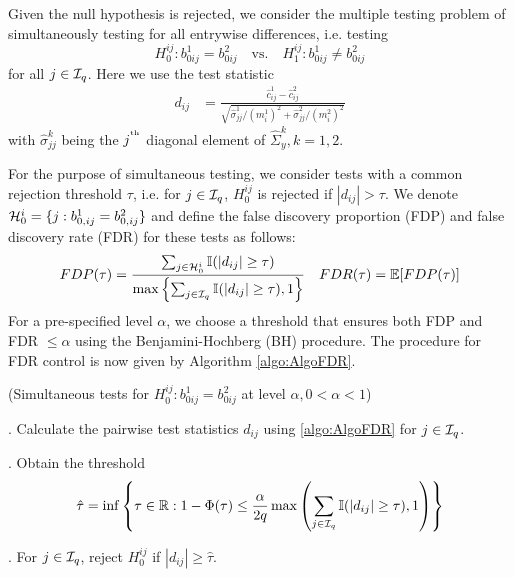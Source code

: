 Given the null hypothesis is rejected, we consider the multiple testing problem of simultaneously testing for all entrywise differences, i.e. testing
%
$$
H_0^{ij}: b_{0 ij}^1 = b_{0ij}^2 \quad \text{vs.} \quad H_1^{ij}: b_{0 ij}^1 \neq b_{0 ij}^2 
$$
%
for all $j \in {\cal{I}}_q$. Here we use the test statistic
%
\begin{align}\label{eqn:PairwiseStatistic}
d_{ij} &= \frac{\widehat c_{ij}^1 - \widehat c_{ij}^2}{\sqrt{\hat \sigma_{jj}^1/ (m_i^1)^2 + \hat \sigma_{jj}^2/ (m_i^2)^2}}
\end{align}
%
with $\hat \sigma_{jj}^k$ being the $j^{\operatorname*{^{\text{th}}}}$ diagonal element of $\widehat \Sigma_y^k, k = 1,2$.

For the purpose of simultaneous testing, we consider tests with a common rejection threshold $\tau$, i.e. for $j \in {\cal{I}}_q$, $H_0^{ij}$ is rejected if $| d_{ij} | > \tau$. We denote ${\cal{H}}_0^i = \{ j: b_{0,ij}^1 = b_{0,ij}^2 \}$ and define the false discovery proportion (FDP) and false discovery rate (FDR) for these tests as follows:
%
$$
FDP (\tau) = \frac{\sum_{j \in {\cal{H}}_0^i} {\mathbb{I}}( |d_{ij}| \geq \tau)}{\max\left\{
\sum_{j \in {\cal{I}}_q} {\mathbb{I}}( |d_{ij}| \geq \tau), 1\right\} }\quad
FDR (\tau) = {\mathbb{E}} [ FDP (\tau) ]
$$
%
For a pre-specified level $\alpha$, we choose a threshold that ensures both FDP and FDR $\leq \alpha$ using the Benjamini-Hochberg (BH) procedure. %
The procedure for FDR control is now given by Algorithm \ref{algo:AlgoFDR}.

\begin{Algorithm}\label{algo:AlgoFDR}
(Simultaneous tests for $H_0^{ij}: b_{0 ij}^1 = b_{0 ij}^2$ at level $\alpha, 0< \alpha< 1$)

. Calculate the pairwise test statistics $d_{ij}$ using \eqref{algo:AlgoFDR} for $j \in {\cal{I}}_q$.

. Obtain the threshold
%
$$
\hat \tau = \inf \left\{\tau \in {\mathbb{R}}: 1 - \Phi(\tau) \leq \frac{\alpha}{2 q}
\max \left( \sum_{j \in {\cal{I}}_q} {\mathbb{I}}( |d_{ij}| \geq \tau), 1 \right) \right\}
$$
%

. For $j \in {\cal{I}}_q$, reject $H_0^{ij}$ if $|d_{ij}| \geq \hat \tau$.
\end{Algorithm}

